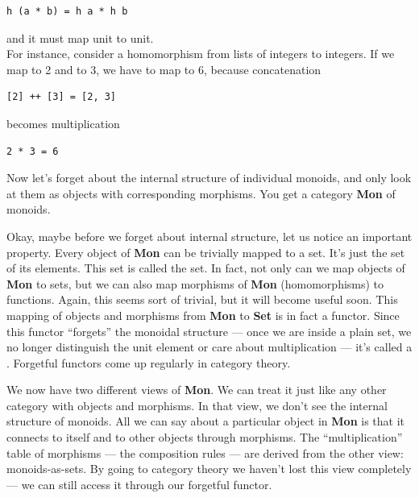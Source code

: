 \begin{Verbatim}[commandchars=\\\{\}]
h (a * b) = h a * h b
\end{Verbatim}

and it must map unit to unit.\\
For instance, consider a homomorphism from lists of integers to
integers. If we map \code{{[}2{]}} to 2 and \code{{[}3{]}} to 3, we
have to map \code{{[}2,\ 3{]}} to 6, because concatenation

\begin{Verbatim}[commandchars=\\\{\}]
[2] ++ [3] = [2, 3]
\end{Verbatim}

becomes multiplication

\begin{Verbatim}[commandchars=\\\{\}]
2 * 3 = 6
\end{Verbatim}

Now let's forget about the internal structure of individual monoids, and
only look at them as objects with corresponding morphisms. You get a
category \textbf{Mon} of monoids.

Okay, maybe before we forget about internal structure, let us notice an
important property. Every object of \textbf{Mon} can be trivially mapped
to a set. It's just the set of its elements. This set is called the
 set. In fact, not only can we map objects of
\textbf{Mon} to sets, but we can also map morphisms of \textbf{Mon}
(homomorphisms) to functions. Again, this seems sort of trivial, but it
will become useful soon. This mapping of objects and morphisms from
\textbf{Mon} to \textbf{Set} is in fact a functor. Since this functor
``forgets'' the monoidal structure --- once we are inside a plain set,
we no longer distinguish the unit element or care about multiplication
--- it's called a . Forgetful functors come up
regularly in category theory.

We now have two different views of \textbf{Mon}. We can treat it just
like any other category with objects and morphisms. In that view, we
don't see the internal structure of monoids. All we can say about a
particular object in \textbf{Mon} is that it connects to itself and to
other objects through morphisms. The ``multiplication'' table of
morphisms --- the composition rules --- are derived from the other view:
monoids-as-sets. By going to category theory we haven't lost this view
completely --- we can still access it through our forgetful functor.

